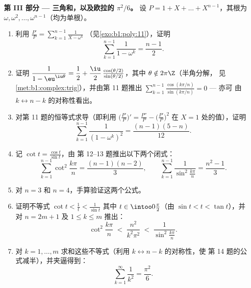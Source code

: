 \begin{problem}
\medskip
\noindent\textbf{第 III 部分 --- 三角和，以及欧拉的
$\pi^2/6$。} 设 $P = 1 + X + \dots + X^{n-1}$，其根为
$\omega, \omega^2, \dots, \omega^{n-1}$（均为单根）。
\begin{enumerate}[resume]
  \item 利用 $\frac{P'}P = \sum_{k=1}^{n-1}\frac1{X - \omega^k}$
        （见\cref{exo:b1:poly:11}），证明
        \[
        \sum_{k=1}^{n-1}\frac{1}{1 - \omega^k} = \frac{n-1}2 .
        \]
  \item 证明 $\dfrac1{1 - \eu^{\iu\theta}} = \dfrac12 +
        \dfrac\iu2\,\frac{\cos(\theta/2)}{\sin(\theta/2)}$，其中
        $\theta \notin 2\pi\Z$（半角分解，
        见\cref{met:b1:complex:trig}），并由第 11 题推出
        $\sum_{k=1}^{n-1}
        \frac{\cos(k\pi/n)}{\sin(k\pi/n)} = 0$ --- 亦可
        由 $k \leftrightarrow n - k$ 的对称性看出。
  \item 对第 11 题的恒等式求导（即利用
        $\bigl(\frac{P'}P\bigr)' = \frac{P''}P -
        \bigl(\frac{P'}P\bigr)^2$ 在 $X = 1$ 处的值），证明
        \[
        \sum_{k=1}^{n-1}\frac{1}{(1 - \omega^k)^2}
        = \frac{(n-1)(5-n)}{12} .
        \]
  \item 记 $\cot t = \frac{\cos t}{\sin t}$，由
        第 12--13 题推出以下两个闭式：
        \[
        \sum_{k=1}^{n-1}\cot^2\frac{k\pi}n = \frac{(n-1)(n-2)}3,
        \qquad
        \sum_{k=1}^{n-1}\frac1{\sin^2\frac{k\pi}n}
        = \frac{n^2-1}3 .
        \]
  \item 对 $n = 3$ 和 $n = 4$，手算验证这两个公式。
  \item 证明不等式 $\cot t < \frac1t < \frac1{\sin t}$
        其中 $t \in \intoo0{\frac\pi2}$（由 $\sin t < t < \tan
        t$），并对 $n = 2m + 1$ 及 $1 \leq k \leq m$ 推出：
        \[
        \cot^2\frac{k\pi}n \;<\; \frac{n^2}{k^2\pi^2}
        \;<\; \frac1{\sin^2\frac{k\pi}n} .
        \]
  \item 对 $k = 1, \dots, m$ 求和这些不等式（利用
        $k \leftrightarrow n - k$ 的对称性，使
        第 14 题的公式减半），并夹逼得到：
        \[
        \sum_{k=1}^{\infty}\frac1{k^2} = \frac{\pi^2}6 .
        \]
\end{enumerate}


\end{problem}
